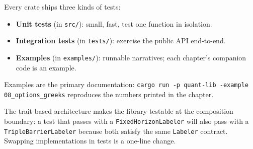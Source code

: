 Every crate ships three kinds of tests:

\begin{itemize}
    \item \textbf{Unit tests} (in \texttt{src/}): small, fast, test one
      function in isolation.
    \item \textbf{Integration tests} (in \texttt{tests/}): exercise the
      public API end-to-end.
    \item \textbf{Examples} (in \texttt{examples/}): runnable
      narratives; each chapter's companion code is an example.
\end{itemize}

Examples are the primary documentation: \texttt{cargo run -p quant-lib
-example 08\_options\_greeks} reproduces the numbers printed in the
chapter.

\begin{keyinsight}
The trait-based architecture makes the library testable at the
composition boundary: a test that passes with a
\texttt{FixedHorizonLabeler} will also pass with a
\texttt{TripleBarrierLabeler} because both satisfy the same
\texttt{Labeler} contract. Swapping implementations in tests is a
one-line change.
\end{keyinsight}